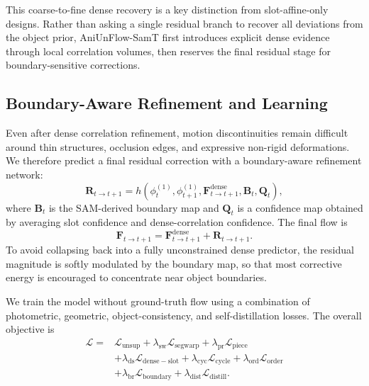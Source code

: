 This coarse-to-fine dense recovery is a key distinction from slot-affine-only designs. Rather than asking a single residual branch to recover all deviations from the object prior, AniUnFlow-SamT first introduces explicit dense evidence through local correlation volumes, then reserves the final residual stage for boundary-sensitive corrections.

\subsection{Boundary-Aware Refinement and Learning}

Even after dense correlation refinement, motion discontinuities remain difficult around thin structures, occlusion edges, and expressive non-rigid deformations. We therefore predict a final residual correction with a boundary-aware refinement network:
\begin{equation}
\mathbf{R}_{t\rightarrow t+1} = h\left(\phi_t^{(1)},\phi_{t+1}^{(1)},\mathbf{F}^{\mathrm{dense}}_{t\rightarrow t+1},\mathbf{B}_t,\mathbf{Q}_t\right),
\end{equation}
where $\mathbf{B}_t$ is the SAM-derived boundary map and $\mathbf{Q}_t$ is a confidence map obtained by averaging slot confidence and dense-correlation confidence. The final flow is
\begin{equation}
\mathbf{F}_{t\rightarrow t+1} = \mathbf{F}^{\mathrm{dense}}_{t\rightarrow t+1} + \mathbf{R}_{t\rightarrow t+1}.
\end{equation}
To avoid collapsing back into a fully unconstrained dense predictor, the residual magnitude is softly modulated by the boundary map, so that most corrective energy is encouraged to concentrate near object boundaries.

We train the model without ground-truth flow using a combination of photometric, geometric, object-consistency, and self-distillation losses. The overall objective is
\begin{equation}
\label{eq:total_loss}
\begin{aligned}
\mathcal{L} = {}& \mathcal{L}_{\mathrm{unsup}} + \lambda_{\mathrm{sw}}\mathcal{L}_{\mathrm{segwarp}} + \lambda_{\mathrm{pr}}\mathcal{L}_{\mathrm{piece}} \\
& + \lambda_{\mathrm{ds}}\mathcal{L}_{\mathrm{dense-slot}} + \lambda_{\mathrm{cyc}}\mathcal{L}_{\mathrm{cycle}} + \lambda_{\mathrm{ord}}\mathcal{L}_{\mathrm{order}} \\
& + \lambda_{\mathrm{br}}\mathcal{L}_{\mathrm{boundary}} + \lambda_{\mathrm{dist}}\mathcal{L}_{\mathrm{distill}}.
\end{aligned}
\end{equation}

